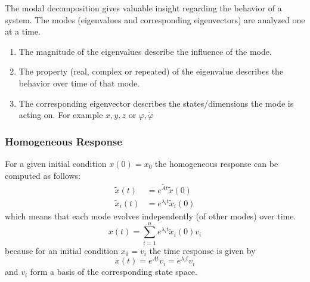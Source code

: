 \begin{examplesection}
    The modal decomposition gives valuable insight regarding the behavior of a system. The modes (eigenvalues and corresponding eigenvectors) are analyzed one at a time.
    \begin{enumerate}
        \item The magnitude of the eigenvalues describe the influence of the mode.
        \item The property (real, complex or repeated) of the eigenvalue describes the behavior over time of that mode.
        \item The corresponding eigenvector describes the states/dimensions the mode is acting on. For example $x,y,z$ or $\varphi, \dot{\varphi}$
    \end{enumerate}
\end{examplesection}

\subsubsection{Homogeneous Response}
For a given initial condition $x(0)=x_0$ the homogeneous response can be computed as follows:\\
\begin{align*}
    \tilde{x}(t)   & =e^{\tilde{A}t}\tilde{x}(0)     \\
    \tilde{x}_i(t) & =e^{\lambda_{i}t}\tilde{x}_i(0)
\end{align*}
which means that each mode evolves independently (of other modes) over time.\\
\begin{equation*}
    x(t)=\sum_{i=1}^{n}e^{\lambda_{i}t}\tilde{x}_i(0)v_i
\end{equation*}
because for an initial condition $x_0 = v_i$ the time response is given by
\begin{equation*}
    x(t)=e^{At}v_i=e^{\lambda_{i}t}v_i
\end{equation*}
and $v_i$ form a basis of the corresponding state space.

